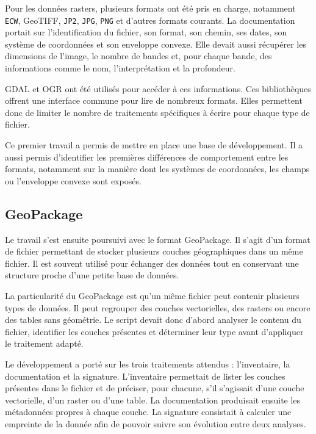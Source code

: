 Pour les données rasters, plusieurs formats ont été pris en charge, notamment
\texttt{ECW}, GeoTIFF, \texttt{JP2}, \texttt{JPG}, \texttt{PNG} et d'autres
formats courants. La documentation portait sur l'identification du fichier, son
format, son chemin, ses dates, son système de coordonnées et son enveloppe convexe. Elle
devait aussi récupérer les dimensions de l'image, le nombre de bandes et, pour
chaque bande, des informations comme le nom, l'interprétation et la profondeur.

GDAL et OGR ont été utilisés pour accéder à ces informations. Ces bibliothèques
offrent une interface commune pour lire de nombreux formats. Elles permettent
donc de limiter le nombre de traitements spécifiques à écrire pour chaque type
de fichier.

Ce premier travail a permis de mettre en place une base de développement. Il a
aussi permis d'identifier les premières différences de comportement entre les
formats, notamment sur la manière dont les systèmes de coordonnées, les champs
ou l'enveloppe convexe sont exposés.



\subsection{GeoPackage}
\label{subsec:geopackage}

Le travail s'est ensuite poursuivi avec le format GeoPackage. Il s'agit d'un
format de fichier permettant de stocker plusieurs couches géographiques dans un
même fichier. Il est souvent utilisé pour échanger des données tout en conservant
une structure proche d'une petite base de données.

La particularité du GeoPackage est qu'un même fichier peut contenir plusieurs
types de données. Il peut regrouper des couches vectorielles, des rasters ou
encore des tables sans géométrie. Le script devait donc d'abord analyser le
contenu du fichier, identifier les couches présentes et déterminer leur type
avant d'appliquer le traitement adapté.

Le développement a porté sur les trois traitements attendus : l'inventaire, la
documentation et la signature. L'inventaire permettait de lister les couches
présentes dans le fichier et de préciser, pour chacune, s'il s'agissait d'une
couche vectorielle, d'un raster ou d'une table. La documentation produisait
ensuite les métadonnées propres à chaque couche. La signature consistait à
calculer une empreinte de la donnée afin de pouvoir suivre son évolution entre
deux analyses.

